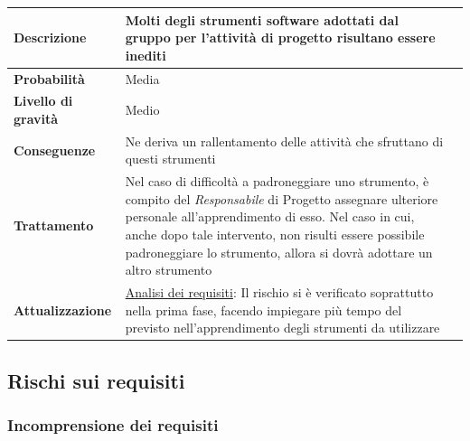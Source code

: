 \begin{center}
	
	\begin{tabular}{|>{\centering}m{4cm} ||>{\centering}m{8cm} |>{\centering\arraybackslash}m{0pt}@{}|}
		\hline
		\textbf{Descrizione} & Molti degli strumenti software adottati dal gruppo per l’attività di progetto risultano essere inediti & \\[2ex]
		\hline	
		\textbf{Probabilità} & Media & \\[1ex]
		\hline
		\textbf{Livello di gravità} & Medio & \\[1ex]
		\hline
		\textbf{Conseguenze} & Ne deriva un rallentamento delle attività
		che sfruttano di questi strumenti & \\[1ex]
		\hline
		\textbf{Trattamento} & Nel caso di difficoltà a padroneggiare uno
		strumento, è compito del  \emph{Responsabile}  di Progetto assegnare
		ulteriore personale all’apprendimento di esso. Nel caso in cui,
		anche dopo tale intervento, non risulti essere possibile
		padroneggiare lo strumento, allora si dovrà adottare un altro
		strumento & \\[1ex] 
		\hline
		\textbf{Attualizzazione} & \underline{Analisi dei requisiti}: Il rischio si è verificato soprattutto nella prima fase, facendo
		impiegare più tempo del previsto nell’apprendimento degli strumenti da utilizzare & \\[1ex]
		\hline
	\end{tabular}
	
\end{center}

\subsection{Rischi sui requisiti}
\subsubsection{Incomprensione dei requisiti}


